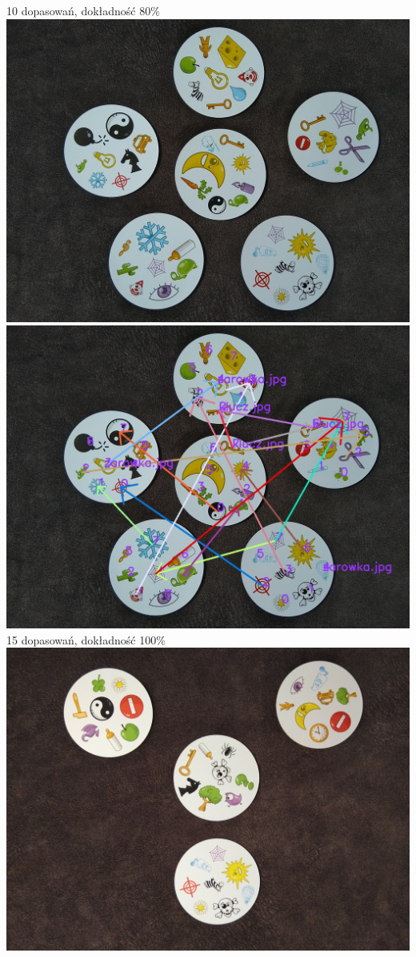 \documentclass[10pt,a4paper]{article}
\begin{document}
\begin{center}
10 dopasowań, dokładność 80\%
\includegraphics[scale=0.28]{easy/dobble04.jpg}
\includegraphics[scale=0.28]{easy/img_arrows3.jpg}\\
15 dopasowań, dokładność 100\%
\includegraphics[scale=0.28]{easy/dobble12.jpg}

\end{center}
\end{document}
